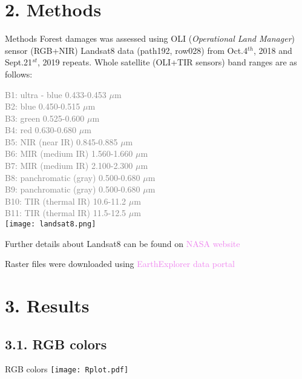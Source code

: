 \documentclass[9pt]{beamer}
\begin{document}
\section{2. Methods}
\begin{frame}{Methods}
	\justifying
	Forest damages was assessed using OLI (\emph{Operational Land Manager}) sensor (RGB+NIR) Landsat8 data (path192, row028) from Oct.4$^{th}$, 2018 and Sept.21$^{st}$, 2019 repeats. Whole satellite (OLI+TIR sensors) band ranges are as follows:
	
	\medskip
	\begin{multicols}{2}
			\justifying
			\small
			\textcolor{gray}{
			B1: ultra - blue 0.433-0.453 $\mu$m\\
			B2: blue 0.450-0.515 $\mu$m\\
			B3: green 0.525-0.600 $\mu$m\\
			B4: red 0.630-0.680 $\mu$m\\
			B5: NIR (near IR) 0.845-0.885 $\mu$m\\
			B6: MIR (medium IR) 1.560-1.660 $\mu$m\\
			B7: MIR (medium IR) 2.100-2.300 $\mu$m\\
			B8: panchromatic (gray) 0.500-0.680 $\mu$m\\
			B9: panchromatic (gray) 0.500-0.680 $\mu$m\\
			B10: TIR (thermal IR) 10.6-11.2 $\mu$m\\
			B11: TIR (thermal IR) 11.5-12.5 $\mu$m\\
		}
		\texttt{[image: landsat8.png]}
	\end{multicols}
	
	\normalsize
	\medskip
	Further details about Landsat8 can be found on \textcolor{violet}{NASA website} \href{https://landsat.gsfc.nasa.gov/landsat-8/landsat-8-overview}{}
	
	Raster files were downloaded using \textcolor{violet}{EarthExplorer data portal} \href{https://earthexplorer.usgs.gov/}{}\\
\end{frame}
	
\section{3. Results}
	\subsection{3.1. RGB colors}
		\begin{frame}{RGB colors}
			\texttt{[image: Rplot.pdf]}
			
		\end{frame}
\end{document}
